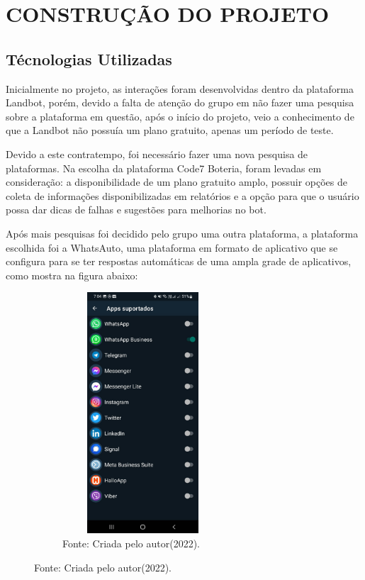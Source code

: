 \chapter{\uppercase{Construção do Projeto}}
\label{Construção do Projeto}

\section{Técnologias Utilizadas}

 Inicialmente no projeto, as interações foram desenvolvidas dentro da plataforma Landbot, porém, devido a falta de atenção do grupo em não fazer uma pesquisa sobre a plataforma em questão, após o início do projeto, veio a conhecimento de que a Landbot não possuía um plano gratuito, apenas um período de teste. 
 
 Devido a este contratempo, foi necessário fazer uma nova pesquisa de plataformas. Na escolha da plataforma Code7 Boteria, foram levadas em consideração: a disponibilidade de um plano gratuito amplo, possuir opções de coleta de informações disponibilizadas em relatórios e a opção para que o usuário possa dar dicas de falhas e sugestões para melhorias no bot.

 Após mais pesquisas foi decidido pelo grupo uma outra plataforma, a plataforma escolhida foi a WhatsAuto, uma plataforma em formato de aplicativo que se configura para se ter respostas automáticas de uma ampla grade de aplicativos, como mostra na figura abaixo:

\begin{figure}[!htb]
\centering
\captionsetup[subfigure]{labelformat=empty}
\caption{``Aplicativos Suportados''}
\begin{subfigure}{.5\textwidth}
\centering
\includegraphics[width=6cm,height=9cm]{Bot/Partes/Imagens/Apps Suportados.jpeg}
\caption{Fonte: Criada pelo autor(2022).}
\end{subfigure}%
\end{figure}

